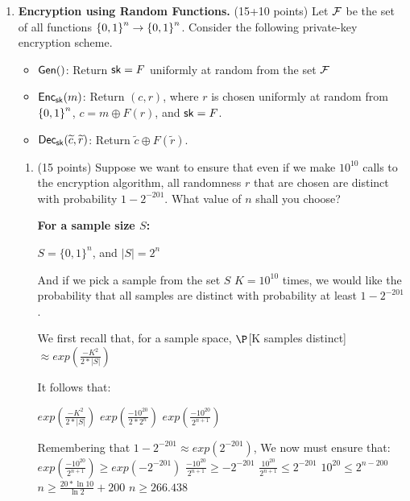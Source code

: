 \documentclass[11pt]{article}
\begin{document}
\begin{enumerate}
\item {\bfseries Encryption using Random Functions.} (15+10 points)
  Let ${\mathcal F}$ be the set of all functions ${\{0,1\}}^{n} \to {\{0,1\}}^n$. 
  Consider the following private-key encryption scheme. 
  \begin{boxedalgo}
  \begin{itemize}
  \item $\mathsf{Gen}()$: Return $\mathsf{sk}=F$ uniformly at random from the set ${\mathcal F}$ 
  \item $\mathsf{Enc}_\mathsf{sk}(m)$: Return $(c,r)$, where $r$ is chosen uniformly at random from ${\{0,1\}}^n$, $c = m\oplus F(r)$, and $\mathsf{sk}=F$.  
  \item $\mathsf{Dec}_\mathsf{sk}(\widetilde c,\widetilde r)$: Return $\widetilde c \oplus F(\widetilde r)$.
  \end{itemize}
  \end{boxedalgo}
  
  \begin{enumerate}
  \item (15 points) Suppose we want to ensure that even if we make $10^{10}$ calls to the encryption algorithm, all randomness $r$ that are chosen are distinct with probability $1-2^{- 201}$. 
    What value of $n$ shall you choose? \newline 
    {\bfseries
      For a sample size $S$:

      $S = \{0,1\}^n$, and $|S| = 2^n$ \newline

      And if we pick a sample from the set $S$ $K = 10^{10}$ times, we would like the probability that all samples are distinct with probability at least $1-2^{-201}$. \newline

      We first recall that, for a sample space, $\P$[K samples distinct]$\approx exp(\frac{-K^2}{2*|S|})$ \newline

      It follows that: \newline

      $exp(\frac{-K^2}{2*|S|})$ \newline
      $exp(\frac{-10^{20}}{2*2^n})$ \newline
      $exp(\frac{-10^{20}}{2^{n+1}})$ \newline

      Remembering that $1-2^{-201} \approx exp(2^{-201})$, We now must ensure that:
      $exp(\frac{-10^{20}}{2^{n+1}}) \geq exp(-2^{-201})$ \newline
      $\frac{-10^{20}}{2^{n+1}} \geq -2^{-201}$ \newline
      $\frac{10^{20}}{2^{n+1}} \leq 2^{-201}$ \newline
      $ 10^{20} \leq 2^{n-200}$ \newline
      $n \geq \frac{20*\ln{10}}{\ln{2}} + 200$ \newline
      $n \geq 266.438$ \newline

}
\end{enumerate}
\end{enumerate}
\end{document}
